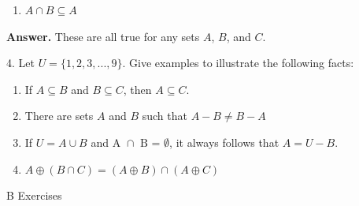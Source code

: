 \documentclass[10pt,]{book}
\theoremstyle{plain}
\theoremstyle{definition}
\theoremstyle{definition}
\theoremstyle{definition}
\theoremstyle{definition}
\begin{document}
\begin{exercisegroup}
\begin{multicols}{2}
\begin{enumerate}[label=\alph*]
\item\hypertarget{li-109}{}  \(A\cap B \subseteq A\) %
\end{enumerate}
\end{multicols}
%
\par\smallskip
\par\smallskip
\noindent\textbf{Answer.}\hypertarget{answer-5}{}\quad
 These are all true for any sets \(A\), \(B\), and \(C\). %
\item[4.]\hypertarget{exercise-10}{} Let \(U= \{1, 2, 3, . . . , 9\}\). Give examples to illustrate the following facts: %
\par
\leavevmode%
\begin{multicols}{1}
\begin{enumerate}[label=\alph*]
\item\hypertarget{li-110}{}  If \(A \subseteq  B\) and \(B \subseteq C\), then \(A\subseteq C\).%
\item\hypertarget{li-111}{} There are sets \(A\) and \(B\) such that \(A - B \neq  B - A\) %
\item\hypertarget{li-112}{}  If \(U = A\cup  B\) and \(\text{A $\cap $ B = $\emptyset $}\), it always follows that \(A = U - B\). %
\item\hypertarget{li-113}{}  \(A \oplus  (B\cap C) = (A \oplus  B)\cap  (A \oplus C)\)   %
\end{enumerate}
\end{multicols}
%
\par\smallskip
\end{exercisegroup}
\par\smallskip\noindent
\hypertarget{exercisegroup-4}{}\typeout{************************************************}
\typeout{************************************************}
B Exercises%
\end{document}

